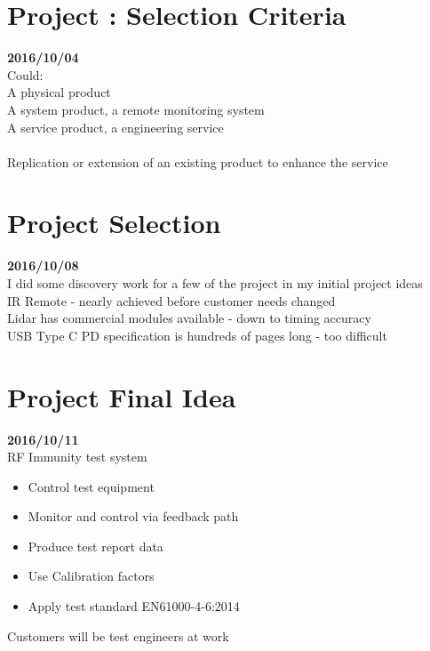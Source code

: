 \section{Project : Selection Criteria}\textbf{2016/10/04}\\
Could:\\
A physical product\\
A system product, a remote monitoring system\\
A service product, a engineering service\\
\\
Replication or extension of an existing product to enhance the service\\

\section{Project Selection}\textbf{2016/10/08}\\
I did some discovery work for a few of the project in my initial project ideas\\
IR Remote - nearly achieved before customer needs changed\\
Lidar has commercial modules available - down to timing accuracy\\
USB Type C PD specification is hundreds of pages long - too difficult\\

\section{Project Final Idea}\textbf{2016/10/11}\\
RF Immunity test system\\
\begin{itemize}
  \item Control test equipment
  \item Monitor and control via feedback path
  \item Produce test report data
  \item Use Calibration factors
  \item Apply test standard \gls{EN61000-4-6:2014}
\end{itemize}
Customers will be test engineers at work\\


